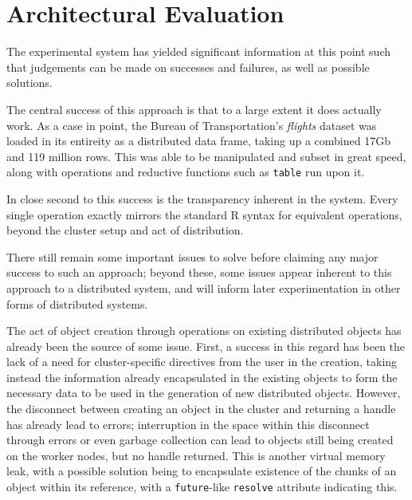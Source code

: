 \documentclass[a4paper,10pt]{article}
\begin{document}
\section{Architectural Evaluation}\label{sec:eval}

The experimental system has yielded significant information at this point
such that judgements can be made on successes and failures, as well as possible
solutions.

The central success of this approach is that to a large extent it does actually
work.
As a case in point, the Bureau of Transportation's
\textit{flights}\cite{bot2009flights} dataset was loaded in its entireity as a
distributed data frame, taking up a combined 17Gb and 119 million rows.
This was able to be manipulated and subset in great speed, along with
operations and reductive functions such as \texttt{table} run upon it.

In close second to this success is the transparency inherent in the system.
Every single operation exactly mirrors the standard R syntax for equivalent
operations, beyond the cluster setup and act of distribution.

There still remain some important issues to solve before claiming any major
success to such an approach; beyond these, some issues appear inherent
to this approach to a distributed system, and will inform later experimentation
in other forms of distributed systems.

The act of object creation through operations on existing distributed objects
has already been the source of some issue.
First, a success in this regard has been the lack of a need for
cluster-specific directives from the user in the creation, taking instead
the information already encapsulated in the existing objects to form the
necessary data to be used in the generation of new distributed objects.
However, the disconnect between creating an object in the cluster and returning
a handle has already lead to errors; interruption in the space within this
disconnect through errors or even garbage collection can lead to objects 
still being created on the worker nodes, but no handle returned.
This is another virtual memory leak, with a possible solution being to
encapsulate existence of the chunks of an object within its reference, with a
\texttt{future}-like \texttt{resolve} attribute indicating this.
\end{document}
